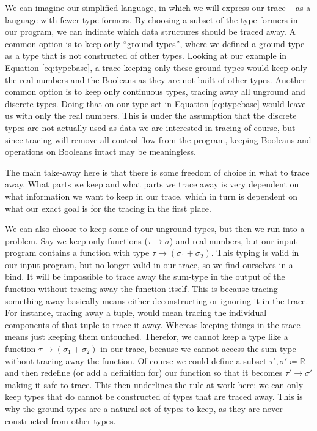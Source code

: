     We can imagine our simplified language, in which we will express our trace -- as a language with fewer type formers.
    By choosing a subset of the type formers in our program, we can indicate which data structures should be traced away.
    A common option is to keep only ``ground types'', where we defined a ground type as a type that is not constructed of other types.
    Looking at our example in Equation \ref{eq:typebase}, a trace keeping only these ground types would keep only the real numbers and the Booleans as they are not built of other types.
    Another common option is to keep only continuous types, tracing away all unground and discrete types.
    Doing that on our type set in Equation \ref{eq:typebase} would leave us with only the real numbers.
    This is under the assumption that the discrete types are not actually used as data we are interested in tracing of course, but since tracing will remove all control flow from the program, keeping Booleans and operations on Booleans intact may be meaningless. 

    The main take-away here is that there is some freedom of choice in what to trace away.
    What parts we keep and what parts we trace away is very dependent on what information we want to keep in our trace, which in turn is dependent on what our exact goal is for the tracing in the first place.
    
    We can also choose to keep some of our unground types, but then we run into a problem.
    Say we keep only functions ($\tau\to\sigma$) and real numbers, but our input program contains a function with type $\tau\to(\sigma_1+\sigma_2)$.
    This typing is valid in our input program, but no longer valid in our trace, so we find ourselves in a bind.
    It will be impossible to trace away the sum-type in the output of the function without tracing away the function itself.
    This is because tracing something away basically means either deconstructing or ignoring it in the trace.
    For instance, tracing away a tuple, would mean tracing the individual components of that tuple to trace it away.
    Whereas keeping things in the trace means just keeping them untouched.
    Therefor, we cannot keep a type like a function $\tau\to(\sigma_1+\sigma_2)$ in our trace, because we cannot access the sum type without tracing away the function.
    Of course we could define a subset $\tau',\sigma'\coloneqq\mathbb{R}$ and then redefine (or add a definition for) our function so that it becomes $\tau'\to\sigma'$ making it safe to trace.
    This then underlines the rule at work here: we can only keep types that do cannot be constructed of types that are traced away.
    This is why the ground types are a natural set of types to keep, as they are never constructed from other types.
    
